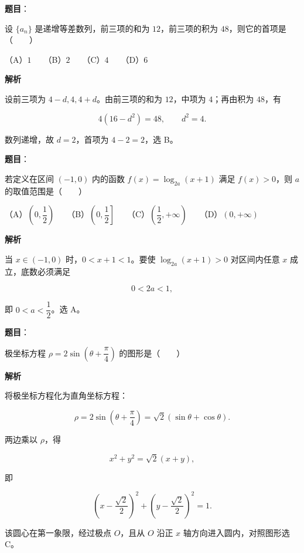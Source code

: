 \begin{answer}

\textbf{题目}：

设 $\{a_n\}$ 是递增等差数列，前三项的和为 $12$，前三项的积为 $48$，则它的首项是\mbox{（　　）}

（A）$1$　　（B）$2$　　（C）$4$　　（D）$6$

\textbf{解析}

设前三项为 $4-d,4,4+d$。由前三项的和为 $12$，中项为 $4$；再由积为 $48$，有

\nopagebreak[4]
\[
4(16-d^2)=48,\qquad d^2=4.
\]

数列递增，故 $d=2$，首项为 $4-2=2$，选 B。


\end{answer}
\begin{answer}

\textbf{题目}：

若定义在区间 $(-1,0)$ 内的函数 $f(x)=\log_{2a}(x+1)$ 满足 $f(x)>0$，则 $a$ 的取值范围是\mbox{（　　）}

（A）$\left(0,\dfrac12\right)$　　（B）$\left(0,\dfrac12\right]$　　（C）$\left(\dfrac12,+\infty\right)$　　（D）$(0,+\infty)$

\textbf{解析}

当 $x\in(-1,0)$ 时，$0<x+1<1$。要使 $\log_{2a}(x+1)>0$ 对区间内任意 $x$ 成立，底数必须满足

\nopagebreak[4]
\[
0<2a<1,
\]

即 $0<a<\dfrac12$。选 A。


\end{answer}
\begin{answer}

\textbf{题目}：

极坐标方程 $\rho=2\sin\left(\theta+\dfrac\pi4\right)$ 的图形是\mbox{（　　）}
\nopagebreak[4]
\begin{center}\end{center}
\nopagebreak[4]
\textbf{解析}

将极坐标方程化为直角坐标方程：

\nopagebreak[4]
\[
\rho=2\sin\left(\theta+\frac\pi4\right)
=\sqrt2(\sin\theta+\cos\theta).
\]

两边乘以 $\rho$，得

\nopagebreak[4]
\[
x^2+y^2=\sqrt2(x+y),
\]

即

\nopagebreak[4]
\[
\left(x-\frac{\sqrt2}{2}\right)^2
+\left(y-\frac{\sqrt2}{2}\right)^2=1.
\]

该圆心在第一象限，经过极点 $O$，且从 $O$ 沿正 $x$ 轴方向进入圆内，对照图形选 C。


\end{answer}
